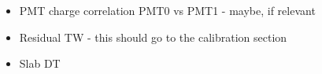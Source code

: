
\begin{itemize}
\item PMT charge correlation PMT0 vs PMT1 - maybe, if relevant
\item Residual TW - this should go to the calibration section
\item Slab DT
\end{itemize}









